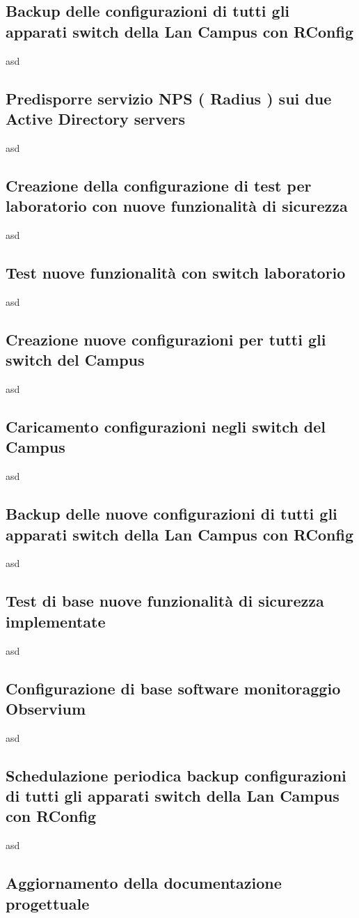 \documentclass[Realizzazione.tex]{subfiles}
\begin{document}
\subsection{Backup delle configurazioni di tutti gli apparati switch della Lan Campus con RConfig} 
asd
\subsection{Predisporre servizio NPS ( Radius ) sui due Active Directory servers} 
asd
\subsection{Creazione della configurazione di test per laboratorio con nuove funzionalità di sicurezza} 
asd
\subsection{Test nuove funzionalità con switch laboratorio} 
asd
\subsection{Creazione nuove configurazioni per tutti gli switch del Campus} 
asd
\subsection{Caricamento configurazioni negli switch del Campus} 
asd
\subsection{Backup delle nuove configurazioni di tutti gli apparati switch della Lan Campus con RConfig} 
asd
\subsection{Test di base nuove funzionalità di sicurezza implementate} 
asd
\subsection{Configurazione di base software monitoraggio Observium}
asd
\subsection{Schedulazione periodica backup configurazioni di tutti gli apparati switch della Lan Campus con RConfig}
asd
\subsection{Aggiornamento della documentazione progettuale}


	
\end{document}
